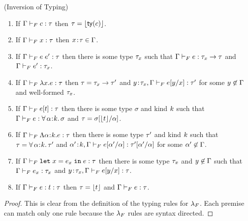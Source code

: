\begin{lemma}\label{lem:inversionF-a} (Inversion of Typing) 
    \begin{enumerate}
        \item If $\hasftype{\tcenv}{c}{\sftype}$ 
            then $\sftype = \forgetreft{\ty{c}}$.
        \item If $\hasftype{\tcenv}{x}{\sftype}$ 
            then $\bind{x}{\sftype} \in \tcenv$.
        \item If $\hasftype{\tcenv}{\app{e}{e'}}{\sftype}$
            then there is some type $\sftype_x$ such that  
            $\hasftype{\tcenv}{e}{\funcftype{\sftype_x}{\sftype}}$ and
            $\hasftype{\tcenv}{e'}{\sftype_x}$.
        \item If $\hasftype{\tcenv}{\vabs{x}{e}}{\sftype}$ 
            then $\sftype = \funcftype{\sftype_x}{\sftype'}$ and
            $\hasftype{\bind{y}{\sftype_x},\tcenv}{\subst{e}{x}{y}}{\sftype'}$
            for some $\notmem{y}{\tcenv}$ and well-formed $\sftype_x$.
        \item If $\hasftype{\tcenv}{\tyapp{e}{t}}{\sftype}$ then there is some
            type $\sigma$ and kind $\skind$ such that 
            $\hasftype{\tcenv}{e}{\polytype{\al}{\skind}{\sigma}}$
            and $\sftype = \subst{\sigma}{\al}{\forgetreft{t}}$.
        \item If $\hasftype{\tcenv}{\tabs{\al}{\skind}{e}}{\sftype}$ then
            there is some type $\sftype'$ and kind $\skind$ such that
            $\sftype = {\polytype{\al}{\skind}{\sftype'}}$ and
            $\hasftype{\bind{\al'}{\skind},\tcenv}{\subst{e}{\al}{\al'}}
            {\subst{\sftype'}{\al}{\al'}}$ for some $\notmem{\al'}{\tcenv}$.
        \item If $\hasftype{\tcenv}{\eletin{x}{e_x}{e}}{\sftype}$ then
            there is some type $\sftype_x$ and $\notmem{y}{\tcenv}$ such that
            $\hasftype{\tcenv}{e_x}{\sftype_x}$ and 
            $\hasftype{\bind{y}{\sftype_x},\tcenv}{\subst{e}{x}{y}}{\sftype}$.
        \item If $\hasftype{\tcenv}{\tyann{e}{t}}{\sftype}$ then 
            $\sftype = \forgetreft{t}$ and $\hasftype{\tcenv}{e}{\sftype}$.
    \end{enumerate}
\end{lemma}
\begin{proof}
This is clear from the definition of the typing rules for $\sysf$. Each premise
can match only one rule because the $\sysf$ rules are syntax directed.
\end{proof}
